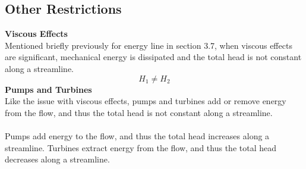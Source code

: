 ﻿\documentclass[12pt]{article}
\begin{document}
\subsection*{Other Restrictions}
\textbf{Viscous Effects}\\
Mentioned briefly previously for energy line in section 3.7, when viscous effects are significant, mechanical energy is dissipated and the total head is not constant along a streamline. 
\[H_1 \neq H_2\]
\textbf{Pumps and Turbines}\\
Like the issue with viscous effects, pumps and turbines add or remove energy from the flow, and thus the total head is not constant along a streamline.\\\\
Pumps add energy to the flow, and thus the total head increases along a streamline. Turbines extract energy from the flow, and thus the total head decreases along a streamline.
\end{document}
